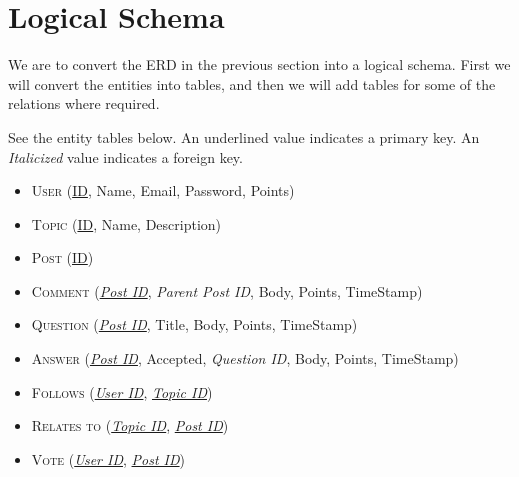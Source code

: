 \newcommand{\key}[1]{\underline{#1}}
\newcommand{\fkey}[1]{\textit{#1}}

\section{Logical Schema}

We are to convert the ERD in the previous section into a logical schema. First we will convert the entities into tables, and then we will add tables for some of the relations where required.

See the entity tables below. An underlined value indicates a primary key. An \emph{Italicized} value indicates a foreign key.

\begin{itemize}
	\item[] \textsc{User} (\key{ID}, Name, Email, Password, Points)
	\item[] \textsc{Topic} (\key{ID}, Name, Description)
	\item[] \textsc{Post} (\key{ID})
	\item[] \textsc{Comment} (\key{\fkey{Post ID}}, \fkey{Parent Post ID}, Body, Points, TimeStamp)
	\item[] \textsc{Question} (\key{\fkey{Post ID}}, Title, Body, Points, TimeStamp)
	\item[] \textsc{Answer} (\key{\fkey{Post ID}}, Accepted, \fkey{Question ID}, Body, Points, TimeStamp)
	\item[] \textsc{Follows} (\key{\fkey{User ID}}, \key{\fkey{Topic ID}})
	\item[] \textsc{Relates to} (\key{\fkey{Topic ID}}, \key{\fkey{Post ID}})
	\item[] \textsc{Vote} (\key{\fkey{User ID}}, \key{\fkey{Post ID}})
\end{itemize}